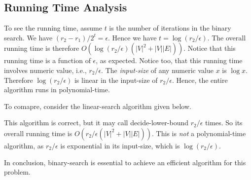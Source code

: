 \subsection*{Running Time Analysis}

To see the running time, assume $t$ is the number of iterations in the binary search.
We have $(r_2 - r_1) / 2^t = \epsilon$. Hence we have $t = \log (r_2 / \epsilon)$.
The overall running time is therefore $O(\log (r_2 / \epsilon) (|V|^2 + |V||E|))$.
Notice that this running time is a function of $\epsilon$, as expected.
Notice too, that this running time involves numeric value, i.e., $r_2 / \epsilon$.
The \emph{input-size} of any numeric value $x$ is $\log x$.
Therefore $\log(r_2 / \epsilon)$ is linear in the input-size of $r_2/\epsilon$.
Hence, the entire algorithm runs in polynomial-time.

To comapre, consider the linear-search algorithm given below.

\begin{algorithmblock}[0.8\textwidth]
	\xxx
	\xxx
	\xxx
	\xxx
	\aab {else: return $(r - \epsilon, r]$;}\xxx
\end{algorithmblock}

This algorithm is correct, but it may call decide-lower-bound $r_2 / \epsilon$ times.
So its overall running time is $O(r_2 / \epsilon (|V|^2 + |V||E|))$.
This is \emph{not} a polynomial-time algorithm,
as $r_2 / \epsilon$ is exponential in its input-size, which is $\log(r_2/\epsilon)$.

In conclusion, binary-search is essential to achieve an efficient algorithm for this problem.


